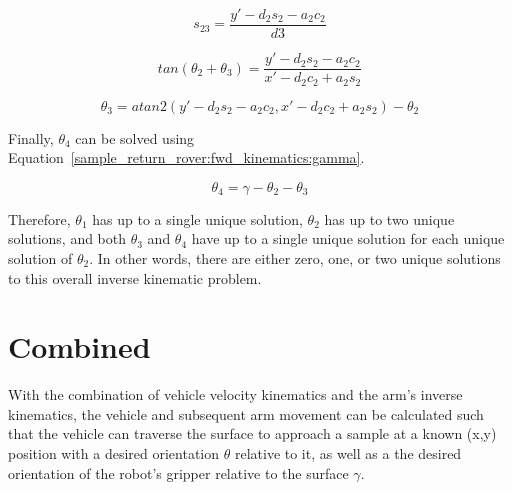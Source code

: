 \begin{equation}\label{sample_return_rover:inv_kinematics:s23}
	s_{23} = \frac{y' - d_{2}s_{2} - a_{2}c_{2}}{d3}
\end{equation}

\begin{equation}\label{sample_return_rover:inv_kinematics:t23}
	tan(\theta_{2} + \theta_{3}) = \frac{y' - d_{2}s_{2} - a_{2}c_{2}}{x'- d_{2}c_{2} + a_{2}s_{2}}
\end{equation}

\begin{equation}\label{sample_return_rover:inv_kinematics:th3}
	\theta_{3} = atan2(y' - d_{2}s_{2} - a_{2}c_{2}, x'- d_{2}c_{2} + a_{2}s_{2}) - \theta_{2}
\end{equation}

Finally, $\theta_{4}$ can be solved using Equation~\ref{sample_return_rover:fwd_kinematics:gamma}.

\begin{equation}
	\theta_{4} = \gamma - \theta_{2} - \theta_{3}
\end{equation}

Therefore, $\theta_{1}$ has up to a single unique solution, $\theta_{2}$ has up to two unique solutions, and both $\theta_{3}$ and $\theta_{4}$ have up to a single unique solution for each unique solution of $\theta_{2}$. In other words, there are either zero, one, or two unique solutions to this overall inverse kinematic problem.

\section{Combined}
With the combination of vehicle velocity kinematics and the arm's inverse kinematics, the vehicle and subsequent arm movement can be calculated such that the vehicle can traverse the surface to approach a sample at a known (x,y) position with a desired orientation $\theta$ relative to it, as well as a the desired orientation of the robot's gripper relative to the surface $\gamma$.
